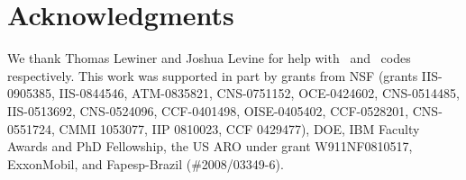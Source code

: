 

\section*{Acknowledgments}
We thank Thomas Lewiner and Joshua Levine for
  help with \mclewiner\ and \deliso\ codes respectively.
This work was supported in part by grants from
  NSF
 (grants IIS-0905385, IIS-0844546,
  ATM-0835821, CNS-0751152, OCE-0424602, CNS-0514485, IIS-0513692,
  CNS-0524096, CCF-0401498, OISE-0405402, CCF-0528201, CNS-0551724,
  CMMI 1053077, IIP 0810023, CCF 0429477),
  DOE,
  IBM Faculty Awards and PhD Fellowship, the
  US ARO %
  under grant W911NF0810517, ExxonMobil, and
  Fapesp-Brazil (\#2008/03349-6).

